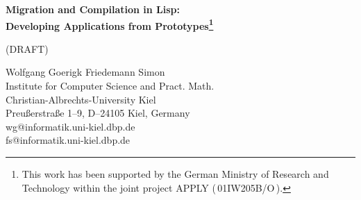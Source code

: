 
\renewcommand{\thefootnote}{\fnsymbol{footnote}}
\pagestyle{empty}

\thispagestyle{empty}

\begin{center}


{\LARGE\bf Migration and Compilation in Lisp:\\ Developing Applications 
from Prototypes\footnote{This work has been supported by the German
Ministry of Research and Technology within the joint project APPLY
(\,01IW205B/O\,).}}

\vspace{1ex}
\centerline{\Large (DRAFT)}

\vspace{3ex}

\large
  Wolfgang Goerigk \hspace*{1.0cm} Friedemann Simon\\[3ex]
  Institute for Computer Science and Pract. Math.\\
  Christian-Albrechts-University Kiel\\
  Preu\ss erstra\ss e 1--9, D--24105 Kiel, Germany\\
  wg@informatik.uni-kiel.dbp.de\\
  fs@informatik.uni-kiel.dbp.de\\
\end{center}

